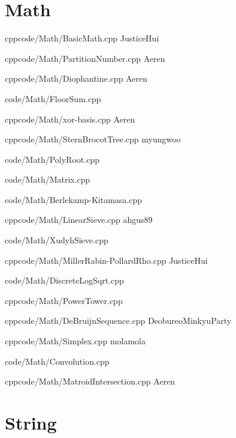 \documentclass[landscape, 8pt, a4paper, oneside]{extarticle}
\begin{document}
\begin{multicols*}{3}
\section{Math}

{}{}
{cpp}{code/Math/BasicMath.cpp}
{JusticeHui}

{}{}
{cpp}{code/Math/PartitionNumber.cpp}
{Aeren}

{}{}
{cpp}{code/Math/Diophantine.cpp}
{Aeren}

{code/Math/FloorSum.cpp}

{}{}
{cpp}{code/Math/xor-basis.cpp}
{Aeren}

{}{}
{cpp}{code/Math/SternBrocotTree.cpp}
{myungwoo}

{code/Math/PolyRoot.cpp}

{code/Math/Matrix.cpp}

{code/Math/Berlekamp-Kitamasa.cpp}

{}{}
{cpp}{code/Math/LinearSieve.cpp}
{ahgus89}

{code/Math/XudyhSieve.cpp}

{}{}
{cpp}{code/Math/MillerRabin-PollardRho.cpp}
{JusticeHui}

{code/Math/DiscreteLogSqrt.cpp}

{}{}
{cpp}{code/Math/PowerTower.cpp}
{}

{}{}
{cpp}{code/Math/DeBruijnSequence.cpp}
{DeobureoMinkyuParty}

{}{}
{cpp}{code/Math/Simplex.cpp}
{molamola}

\noindent


{code/Math/Convolution.cpp}

{}{}
{cpp}{code/Math/MatroidIntersection.cpp}
{Aeren}

\section{String}


\end{multicols*}
\end{document}
